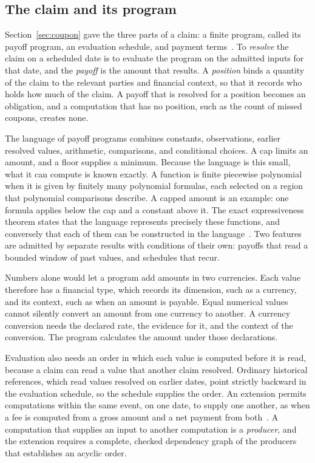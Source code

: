 \documentclass{momentum}
\begin{document}
\subsection{The claim and its program}
\label{sec:conditions-claim}

Section~\ref{sec:coupon} gave the three parts of a claim: a finite program, called its payoff program, an evaluation schedule, and payment terms~\cite{claim}. To \emph{resolve} the claim on a scheduled date is to evaluate the program on the admitted inputs for that date, and the \emph{payoff} is the amount that results. A \emph{position} binds a quantity of the claim to the relevant parties and financial context, so that it records who holds how much of the claim. A payoff that is resolved for a position becomes an obligation, and a computation that has no position, such as the count of missed coupons, creates none.

The language of payoff programs combines constants, observations, earlier resolved values, arithmetic, comparisons, and conditional choices. A cap limits an amount, and a floor supplies a minimum. Because the language is this small, what it can compute is known exactly. A function is finite piecewise polynomial when it is given by finitely many polynomial formulas, each selected on a region that polynomial comparisons describe. A capped amount is an example: one formula applies below the cap and a constant above it. The exact expressiveness theorem states that the language represents precisely these functions, and conversely that each of them can be constructed in the language~\cite[Section~2.3]{claim}. Two features are admitted by separate results with conditions of their own: payoffs that read a bounded window of past values, and schedules that recur.

Numbers alone would let a program add amounts in two currencies. Each value therefore has a financial type, which records its dimension, such as a currency, and its context, such as when an amount is payable. Equal numerical values cannot silently convert an amount from one currency to another. A currency conversion needs the declared rate, the evidence for it, and the context of the conversion. The program calculates the amount under those declarations.

Evaluation also needs an order in which each value is computed before it is read, because a claim can read a value that another claim resolved. Ordinary historical references, which read values resolved on earlier dates, point strictly backward in the evaluation schedule, so the schedule supplies the order. An extension permits computations within the same event, on one date, to supply one another, as when a fee is computed from a gross amount and a net payment from both~\cite[Section~4.3]{claim}. A computation that supplies an input to another computation is a \emph{producer}, and the extension requires a complete, checked dependency graph of the producers that establishes an acyclic order.
\end{document}
